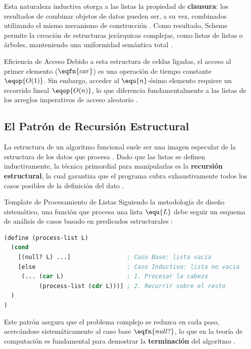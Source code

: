 Esta naturaleza inductiva otorga a las listas la propiedad de \textbf{clausura}: los resultados de combinar objetos de datos pueden ser, a su vez, combinados utilizando el mismo mecanismo de construcción \cite{SICP}. Como resultado, Scheme permite la creación de estructuras jerárquicas complejas, como listas de listas o árboles, manteniendo una uniformidad semántica total \cite{SICP, HtDP}.

\begin{observacion}{Eficiencia de Acceso}
Debido a esta estructura de celdas ligadas, el acceso al primer elemento ($\eqfn{car}$) es una operación de tiempo constante $\eqop{O(1)}$. Sin embargo, acceder al $\equ{n}$-ésimo elemento requiere un recorrido lineal $\eqop{O(n)}$, lo que diferencia fundamentalmente a las listas de los arreglos imperativos de acceso aleatorio \cite{SICP}.
\end{observacion}

\subsection{El Patrón de Recursión Estructural}
\label{subsec:4_3_3_recursion_estructural}

La estructura de un algoritmo funcional suele ser una imagen especular de la estructura de los datos que procesa \cite{HtDP}. Dado que las listas se definen inductivamente, la técnica primordial para manipularlas es la \textbf{recursión estructural}, la cual garantiza que el programa cubra exhaustivamente todos los casos posibles de la definición del dato \cite{HtDP}.

\begin{definicion}{Template de Procesamiento de Listas}
Siguiendo la metodología de diseño sistemático, una función que procesa una lista $\equ{L}$ debe seguir un esquema de análisis de casos basado en predicados estructurales \cite{HtDP}:
\begin{lstlisting}[language=Lisp, caption={Esquema general de recursión estructural}]
(define (process-list L)
  (cond
    [(null? L) ...]                ; Caso Base: lista vacia
    [else                          ; Caso Inductivo: lista no vacia
     (... (car L)                  ; 1. Procesar la cabeza
          (process-list (cdr L)))] ; 2. Recurrir sobre el resto
  )
)
\end{lstlisting}
\end{definicion}

Este patrón asegura que el problema complejo se reduzca en cada paso, acercándose sistemáticamente al caso base $\eqfn{null?}$, lo que en la teoría de computación es fundamental para demostrar la \textbf{terminación} del algoritmo \cite{PFPL}.

